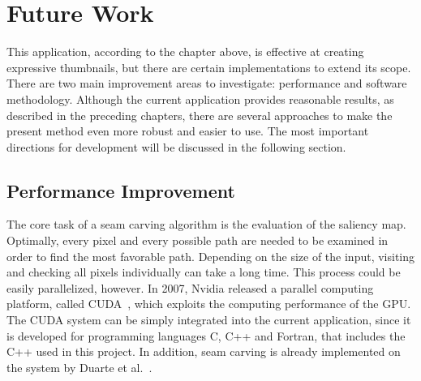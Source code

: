 \documentclass[draft,final]{vutinfth} %
\begin{document}
	\chapter{Future Work}
	\label{futureWork}
	This application, according to the chapter above, is effective at creating expressive thumbnails, but there are certain implementations to extend its scope. 
	There are two main improvement areas to investigate: performance and software methodology.
	Although the current application provides reasonable results, as described in the preceding chapters, there are several approaches to make the present method even more robust and easier to use.
	The most important directions for development will be discussed in the following section.
	
	\section{Performance Improvement} 
	The core task of a seam carving algorithm is the evaluation of the saliency map.
	Optimally, every pixel and every possible path are needed to be examined in order to find the most favorable path.
	Depending on the size of the input, visiting and checking all pixels individually can take a long time.
	This process could be easily parallelized, however.
	In 2007, Nvidia released a parallel computing platform, called CUDA~\cite{Cook:2012:CPD:2430671}, which exploits the computing performance of the GPU.
	The CUDA system can be simply integrated into the current application, since it is developed for programming languages C, C++ and Fortran, that includes the C++ used in this project.
	In addition, seam carving is already implemented on the system by Duarte et al.~\cite{duarte2012accelerating}.
	
\end{document}
